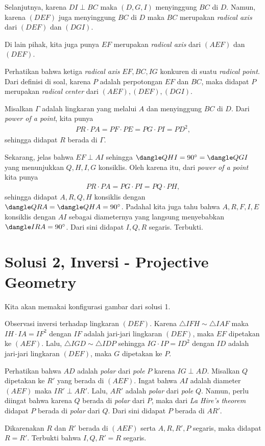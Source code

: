     Selanjutnya, karena $DI \perp BC$ maka $(D,G,I)$ menyinggung $BC$ di $D$. Namun, karena $(DEF)$ juga menyinggung $BC$ di $D$ maka $BC$ merupakan \textit{radical axis} dari $(DEF)$ dan $(DGI)$.

    Di lain pihak, kita juga punya $EF$ merupakan \textit{radical axis} dari $(AEF)$ dan $(DEF)$.

    Perhatikan bahwa ketiga \textit{radical axis} $EF, BC, IG$ konkuren di suatu \textit{radical point}. Dari definisi di soal, karena $P$ adalah perpotongan $EF$ dan $BC$, maka didapat $P$ merupakan \textit{radical center} dari $(AEF), (DEF), (DGI)$.

    Misalkan $\Gamma$ adalah lingkaran yang melalui $A$ dan menyinggung $BC$ di $D$. Dari \textit{power of a point}, kita punya
    \begin{align*}
        PR \cdot PA = PF \cdot PE = PG \cdot PI = PD^2,
    \end{align*}
    sehingga didapat $R$ berada di $\Gamma$.

    Sekarang, jelas bahwa $EF \perp AI$ sehingga $\dangle QHI = 90^\circ = \dangle QGI$ yang menunjukkan $Q,H,I,G$ konsiklis. Oleh karena itu, dari \textit{power of a point} kita punya
    \begin{align*}
        PR \cdot PA = PG \cdot PI = PQ \cdot PH,
    \end{align*}
    sehingga didapat $A,R,Q,H$ konsiklis dengan $\dangle QRA = \dangle QHA = 90^\circ$. 
    Padahal kita juga tahu bahwa $A,R,F,I,E$ konsiklis dengan $AI$ sebagai diameternya yang langsung menyebabkan $\dangle IRA = 90^\circ$. Dari sini didapat $I,Q,R$ segaris. Terbukti.

\newpage
\section{Solusi 2, Inversi - Projective Geometry}
    Kita akan memakai konfigurasi gambar dari solusi 1.
        
    Observasi inversi terhadap lingkaran $(DEF)$. 
    Karena $\triangle IFH \sim \triangle IAF$ maka $IH \cdot IA = IF^2$ dengan $IF$ adalah jari-jari lingkaran $(DEF)$, maka $EF$ dipetakan ke $(AEF)$.
    Lalu, $\triangle IGD \sim \triangle IDP$ sehingga $IG \cdot IP = ID^2$ dengan $ID$ adalah jari-jari lingkaran $(DEF)$, maka $G$ dipetakan ke $P$.

    Perhatikan bahwa $AD$ adalah \textit{polar} dari \textit{pole} $P$ karena $IG \perp AD$.
    Misalkan $Q$ dipetakan ke $R'$ yang berada di $(AEF)$. Ingat bahwa $AI$ adalah diameter $(AEF)$ maka $IR' \perp AR'$. 
    Lalu, $AR'$ adalah \textit{polar} dari \textit{pole} $Q$. 
    Namun, perlu diingat bahwa karena $Q$ berada di \textit{polar} dari $P$, maka dari \textit{La Hire's theorem} didapat $P$ berada di \textit{polar} dari $Q$. Dari sini didapat $P$ berada di $AR'$.

    Dikarenakan $R$ dan $R'$ berada di $(AEF)$ serta $A,R,R',P$ segaris, maka didapat $R=R'$. Terbukti bahwa $I,Q,R'=R$ segaris.
